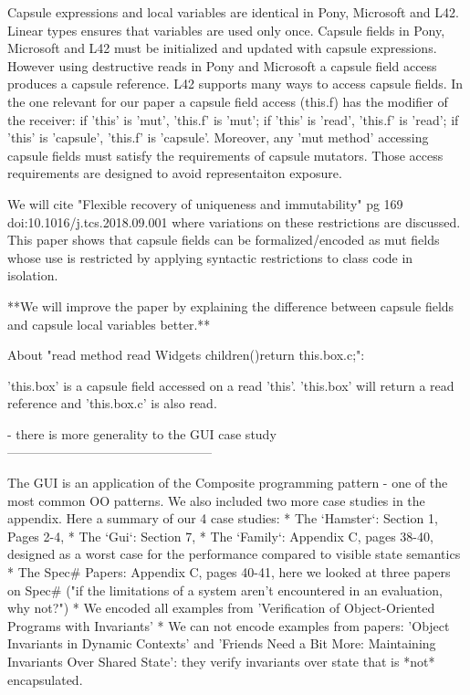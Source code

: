 Capsule expressions and local variables are identical in Pony, Microsoft and L42. Linear types ensures that variables are used only once.
Capsule fields in Pony, Microsoft and L42 must be initialized and updated 
with capsule expressions.
However using destructive reads in Pony and Microsoft a capsule field access produces a capsule reference.
L42 supports many ways to access capsule fields.
In the one relevant for our paper a capsule field access (this.f) has the modifier of the receiver: if 'this' is 'mut', 'this.f' is 'mut'; if 'this' is 'read', 'this.f' is 'read'; if 'this' is 'capsule', 'this.f' is 'capsule'.
Moreover, any 'mut method' accessing capsule fields must satisfy the requirements of capsule mutators.
Those access requirements are designed to avoid representaiton exposure.

We will cite "Flexible recovery of uniqueness and immutability" 
pg 169 doi:10.1016/j.tcs.2018.09.001 where variations on these restrictions  are discussed.
This paper shows that capsule fields can be formalized/encoded as mut fields whose use is restricted by applying syntactic restrictions to class code in isolation.

**We will improve the paper by explaining the difference between capsule fields and capsule local variables better.**

About "read method read Widgets children(){return this.box.c;}":

'this.box' is a capsule field accessed on a read 'this'. 'this.box' will return a read reference
and 'this.box.c' is also read.

- there is more generality to the GUI case study
------------------------------------------------

The GUI is an application of the Composite programming pattern - one of the most common OO patterns.
We also included two more case studies in the appendix.
Here a summary of our 4 case studies:
* The `Hamster`: Section 1, Pages 2-4, 
* The `Gui`: Section 7,
* The `Family`: Appendix C, pages 38-40,
  designed as a worst case for the performance compared to visible state semantics
* The Spec# Papers: Appendix C, pages 40-41,
  here we looked at three papers on Spec# ("if the limitations of a system aren't encountered in an evaluation, why not?")
 *  We encoded all examples from 'Verification of Object-Oriented Programs with Invariants'
 *  We can not encode examples from  papers: 'Object Invariants in Dynamic Contexts' and
   'Friends Need a Bit More: Maintaining Invariants Over Shared State':
   they verify invariants over state that is *not* encapsulated.


